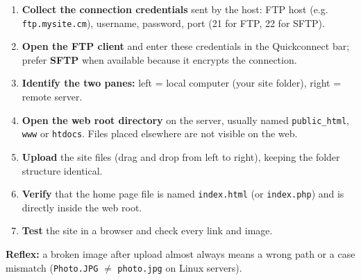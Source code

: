 \documentclass[11pt]{article}
\begin{document}
\begin{methode}
\begin{enumerate}
\item \textbf{Collect the connection credentials} sent by the host: FTP host (e.g. \texttt{ftp.mysite.cm}), username, password, port (21 for FTP, 22 for SFTP).
\item \textbf{Open the FTP client} and enter these credentials in the Quickconnect bar; prefer \textbf{SFTP} when available because it encrypts the connection.
\item \textbf{Identify the two panes:} left = local computer (your site folder), right = remote server.
\item \textbf{Open the web root directory} on the server, usually named \texttt{public\_html}, \texttt{www} or \texttt{htdocs}. Files placed elsewhere are not visible on the web.
\item \textbf{Upload} the site files (drag and drop from left to right), keeping the folder structure identical.
\item \textbf{Verify} that the home page file is named \texttt{index.html} (or \texttt{index.php}) and is directly inside the web root.
\item \textbf{Test} the site in a browser and check every link and image.
\end{enumerate}
\textbf{Reflex:} a broken image after upload almost always means a wrong path or a case mismatch (\texttt{Photo.JPG} $\neq$ \texttt{photo.jpg} on Linux servers).
\end{methode}
\end{document}
